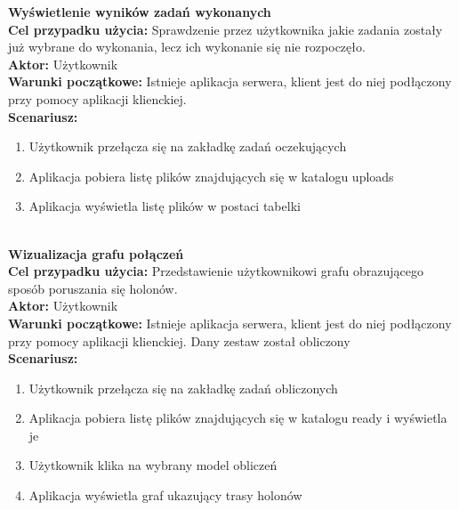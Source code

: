 	\textbf{Wyświetlenie wyników zadań wykonanych}\\
	\textbf{Cel przypadku użycia:} Sprawdzenie przez użytkownika jakie zadania zostały już wybrane do wykonania, lecz ich wykonanie się nie rozpoczęło.\\
	\textbf{Aktor:} Użytkownik\\
	\textbf{Warunki początkowe:} Istnieje aplikacja serwera, klient jest do niej podłączony przy pomocy aplikacji klienckiej.\\
	\textbf{Scenariusz:}
	\begin{enumerate}
	\item Użytkownik przełącza się na zakładkę zadań oczekujących
	\item Aplikacja pobiera listę plików znajdujących się w katalogu uploads
	\item  Aplikacja wyświetla listę plików w postaci tabelki\\\\
	\end{enumerate}
	
	\textbf{Wizualizacja grafu połączeń}\\
	\textbf{Cel przypadku użycia:} Przedstawienie użytkownikowi grafu obrazującego sposób poruszania się holonów.\\
	\textbf{Aktor:} Użytkownik\\
	\textbf{Warunki początkowe:} Istnieje aplikacja serwera, klient jest do niej podłączony przy pomocy aplikacji klienckiej. Dany zestaw został obliczony\\
	\textbf{Scenariusz:}
	\begin{enumerate}
	\item Użytkownik przełącza się na zakładkę zadań obliczonych
	\item Aplikacja pobiera listę plików znajdujących się w katalogu ready i wyświetla je
	\item Użytkownik klika na wybrany model obliczeń
	\item Aplikacja wyświetla graf ukazujący trasy holonów\\\\
	\end{enumerate}
	
